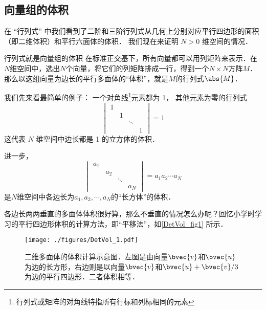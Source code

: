 
\begin{issues}
\issueDraft
\end{issues}


\subsection{向量组的体积}

在 “行列式” 中我们看到了二阶和三阶行列式从几何上分别对应平行四边形的面积（即二维体积）和平行六面体的体积． 我们现在来证明 $N > 0$ 维空间的情况．

\begin{theorem}{行列式就是向量组的体积}
在标准正交基下，所有向量都可以用列矩阵来表示．在$N$维空间中，选出$N$个向量，将它们的列矩阵排成一行，得到一个$N\times N$方阵$M$．那么以这组向量为边长的平行多面体的“体积”，就是$M$的行列式$\abs{M}$．
\end{theorem}


我们先来看最简单的例子： 一个对角线\footnote{行列式或矩阵的对角线特指所有行标和列标相同的元素}元素都为 1， 其他元素为零的行列式
\begin{equation}
\begin{vmatrix}
1 & & &\\
  & 1 & &\\
  &  & \ddots &\\
  & & & 1
\end{vmatrix} = 1
\end{equation}
这代表 $N$ 维空间中边长都是 1 的立方体的体积．

进一步，
\begin{equation}
\begin{vmatrix}
a_1 & & &\\
  & a_2 & &\\
  &  & \ddots &\\
  & & & a_N
\end{vmatrix} = a_1a_2\cdots a_N
\end{equation}
是$N$维空间中各边长为$a_1, a_2, \cdots, a_N$的“长方体”的体积．

各边长两两垂直的多面体体积很好算，那么不垂直的情况怎么办呢？回忆小学时学习的平行四边形体积的计算方法，即“平移法”，如\autoref{DetVol_fig1} 所示．
\begin{figure}[ht]
\centering
\texttt{[image: ./figures/DetVol\_1.pdf]}
\caption{二维多面体的体积计算示意图．左图是由向量$\bvec{v}$和$\bvec{u}$为边的长方形，右边则是以向量$\bvec{v}$和$\bvec{u}+\bvec{v}/3$为边的平行四边形．二者体积相等．} \label{DetVol_fig1}
\end{figure}

